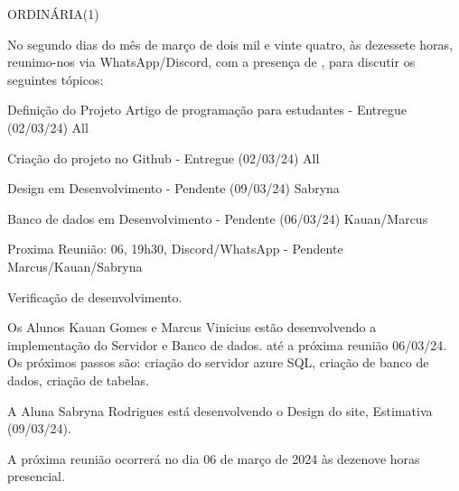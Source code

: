 \documentclass[11pt,twoside]{ata}
\date{02 de março de 2024}
\begin{document}
\begin{reuniao}{ORDINÁRIA(1)}




    No segundo dias do mês de março de dois mil e vinte quatro, às dezessete horas, reunimo-nos via WhatsApp/Discord, com a presença de , para discutir os seguintes tópicos:
    
    \begin{informes}
        \item Definição do Projeto Artigo de programação para estudantes - Entregue (02/03/24) All
        \item Criação do projeto no Github - Entregue (02/03/24) All
        \item Design em Desenvolvimento - Pendente (09/03/24) Sabryna
        \item Banco de dados em Desenvolvimento - Pendente (06/03/24) Kauan/Marcus        
        \item Proxima Reunião: 06, 19h30, Discord/WhatsApp - Pendente Marcus/Kauan/Sabryna 
    \end{informes}
 
    \begin{Topicos}
        \item Verificação de desenvolvimento.
        \item Os Alunos Kauan Gomes e Marcus Vinicius estão desenvolvendo a implementação do Servidor e Banco de dados. até a próxima reunião 06/03/24. Os próximos passos são: criação do servidor azure SQL, criação de banco de dados, criação de tabelas.
        \item A Aluna Sabryna Rodrigues está desenvolvendo o Design do site, Estimativa (09/03/24).
        \item A próxima reunião ocorrerá no dia 06 de março de 2024 às dezenove horas presencial.
\end{Topicos}
\end{reuniao}


\begin{Ciencia} 

\end{Ciencia}
\end{document}
